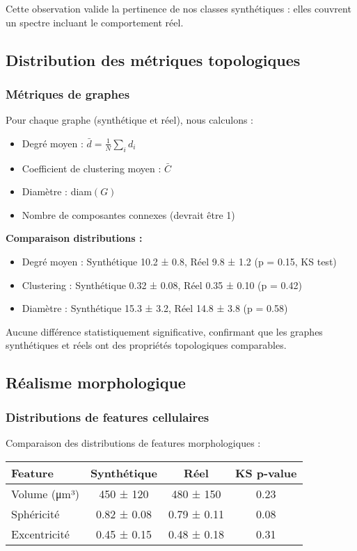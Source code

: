 Cette observation valide la pertinence de nos classes synthétiques : elles couvrent un spectre incluant le comportement réel.

\subsection{Distribution des métriques topologiques}

\subsubsection{Métriques de graphes}

Pour chaque graphe (synthétique et réel), nous calculons :
\begin{itemize}
    \item Degré moyen : $\bar{d} = \frac{1}{N}\sum_i d_i$
    \item Coefficient de clustering moyen : $\bar{C}$
    \item Diamètre : diam$(G)$
    \item Nombre de composantes connexes (devrait être 1)
\end{itemize}

\textbf{Comparaison distributions :}
\begin{itemize}
    \item Degré moyen : Synthétique 10.2 ± 0.8, Réel 9.8 ± 1.2 (p = 0.15, KS test)
    \item Clustering : Synthétique 0.32 ± 0.08, Réel 0.35 ± 0.10 (p = 0.42)
    \item Diamètre : Synthétique 15.3 ± 3.2, Réel 14.8 ± 3.8 (p = 0.58)
\end{itemize}

Aucune différence statistiquement significative, confirmant que les graphes synthétiques et réels ont des propriétés topologiques comparables.

\subsection{Réalisme morphologique}

\subsubsection{Distributions de features cellulaires}

Comparaison des distributions de features morphologiques :

\begin{center}
\begin{tabular}{|l|c|c|c|}
\hline
\textbf{Feature} & \textbf{Synthétique} & \textbf{Réel} & \textbf{KS p-value} \\
\hline
Volume (μm³) & 450 ± 120 & 480 ± 150 & 0.23 \\
Sphéricité & 0.82 ± 0.08 & 0.79 ± 0.11 & 0.08 \\
Excentricité & 0.45 ± 0.15 & 0.48 ± 0.18 & 0.31 \\
\hline
\end{tabular}
\end{center}

